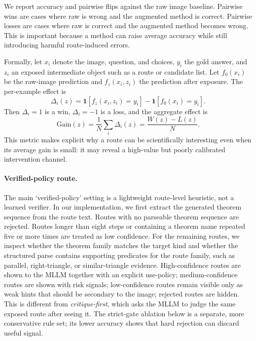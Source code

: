 \documentclass[11pt]{article}
\begin{document}
We report accuracy and pairwise flips against the raw image baseline. Pairwise wins are cases where raw is wrong and the augmented method is correct. Pairwise losses are cases where raw is correct and the augmented method becomes wrong. This is important because a method can raise average accuracy while still introducing harmful route-induced errors.

Formally, let \(x_i\) denote the image, question, and choices, \(y_i\) the gold answer, and \(z_i\) an exposed intermediate object such as a route or candidate list. Let \(f_0(x_i)\) be the raw-image prediction and \(f_z(x_i,z_i)\) the prediction after exposure. The per-example effect is
\begin{equation}
\Delta_i(z)=
\mathbf{1}[f_z(x_i,z_i)=y_i]-
\mathbf{1}[f_0(x_i)=y_i].
\end{equation}
Then \(\Delta_i=1\) is a win, \(\Delta_i=-1\) is a loss, and the aggregate effect is
\begin{equation}
\mathrm{Gain}(z)=\frac{1}{N}\sum_i \Delta_i(z)=\frac{W(z)-L(z)}{N}.
\end{equation}
This metric makes explicit why a route can be scientifically interesting even when its average gain is small: it may reveal a high-value but poorly calibrated intervention channel.

\paragraph{Verified-policy route.}
The main `verified-policy' setting is a lightweight route-level heuristic, not a learned verifier. In our implementation, we first extract the generated theorem sequence from the route text. Routes with no parseable theorem sequence are rejected. Routes longer than eight steps or containing a theorem name repeated five or more times are treated as low confidence. For the remaining routes, we inspect whether the theorem family matches the target kind and whether the structured parse contains supporting predicates for the route family, such as parallel, right-triangle, or similar-triangle evidence. High-confidence routes are shown to the MLLM together with an explicit use-policy; medium-confidence routes are shown with risk signals; low-confidence routes remain visible only as weak hints that should be secondary to the image; rejected routes are hidden. This is different from \emph{critique-first}, which asks the MLLM to judge the same exposed route after seeing it. The strict-gate ablation below is a separate, more conservative rule set; its lower accuracy shows that hard rejection can discard useful signal.
\end{document}
